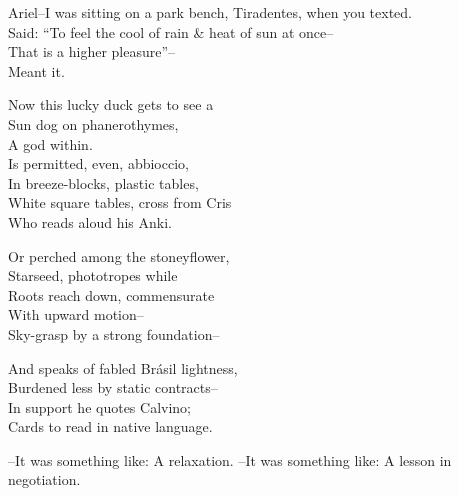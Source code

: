 Ariel--I was sitting on a park bench, Tiradentes, when you texted. \\
Said: ``To feel the cool of rain \& heat of sun at once-- \\
That is a higher pleasure''-- \\
Meant it.

Now this lucky duck gets to see a \\
Sun dog on phanerothymes, \\ 
A god within. \\
Is permitted, even, abbioccio, \\
In breeze-blocks, plastic tables, \\
White square tables, cross from Cris \\
Who reads aloud his Anki.

Or perched among the stoneyflower, \\
Starseed, phototropes while \\
Roots reach down, commensurate \\
With upward motion-- \\
Sky-grasp by a strong foundation-- 

And speaks of fabled Brásil lightness, \\
Burdened less by static contracts-- \\
In support he quotes Calvino; \\
Cards to read in native language.

--It was something like: A relaxation.
--It was something like: A lesson in negotiation.